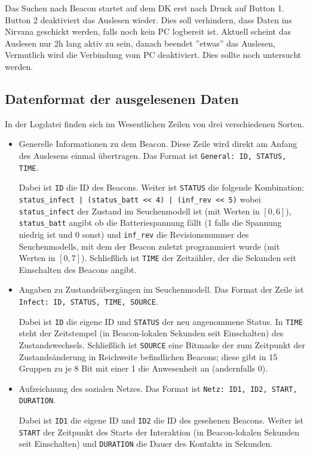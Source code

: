 \documentclass[11pt,ngerman]{scrartcl} %
\begin{document}
Das Suchen nach Beacon startet auf dem DK erst nach Druck auf Button 1. Button 2 deaktiviert das Auslesen wieder. Dies soll verhindern, dass Daten ins Nirvana geschickt werden, falls noch kein PC logbereit ist.
Aktuell scheint das Auslesen nur 2h lang aktiv zu sein, danach beendet ''etwas'' das Auslesen, Vermutlich wird die Verbindung vom PC deaktiviert. Dies sollte noch untersucht werden.

\subsection{Datenformat der ausgelesenen Daten}

In der Logdatei finden sich im Wesentlichen Zeilen von drei verschiedenen Sorten.
\begin{itemize}
\item Generelle Informationen zu dem Beacon. Diese Zeile wird direkt am
  Anfang des Auslesens einmal übertragen. Das Format ist
  \verb!General: ID, STATUS, TIME!.

  Dabei ist \verb!ID! die ID des Beacons. Weiter ist \verb!STATUS! die
  folgende Kombination: \verb!status_infect | (status_batt << 4) | (inf_rev << 5)! 
  wobei \verb!status_infect! der Zustand im Seuchenmodell ist (mit Werten in
  $[0,6]$), \verb!status_batt! angibt ob die Batteriespannung fällt (1 falls
  die Spannung niedrig ist und 0 sonst) und \verb!inf_rev! die
  Revisionsnummer des Seuchenmodells, mit dem der Beacon zuletzt
  programmiert wurde (mit Werten in $[0,7]$). Schließlich ist \verb!TIME!
  der Zeitzähler, der die Sekunden seit Einschalten des Beacons angibt.
\item Angaben zu Zustandsübergängen im Seuchenmodell. Das Format der Zeile ist
  \verb!Infect: ID, STATUS, TIME, SOURCE!.

  Dabei ist \verb!ID! die eigene ID und \verb!STATUS! der neu angenommene
  Status. In \verb!TIME! steht der Zeitstempel (in Beacon-lokalen Sekunden
  seit Einschalten) des Zustandswechsels. Schließlich ist \verb!SOURCE! eine
  Bitmaske der zum Zeitpunkt der Zustandsänderung in Reichweite befindlichen
  Beacons; diese gibt in 15 Gruppen zu je 8 Bit mit einer 1 die Anwesenheit
  an (andernfalls 0).
\item Aufzeichnung des sozialen Netzes. Das Format ist
  \verb!Netz: ID1, ID2, START, DURATION!.

  Dabei ist \verb!ID1! die eigene ID und \verb!ID2! die ID des gesehenen
  Beacons. Weiter ist \verb!START! der Zeitpunkt des Starts der Interaktion
  (in Beacon-lokalen Sekunden seit Einschalten) und \verb!DURATION! die
  Dauer des Kontakts in Sekunden.
\end{itemize}
\end{document}
